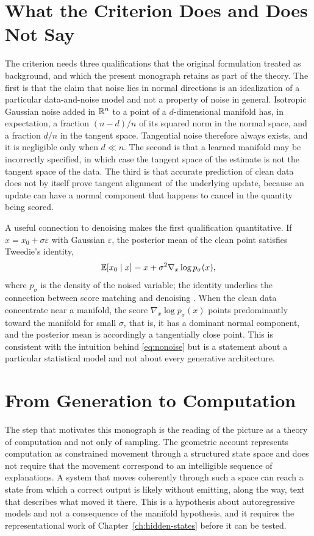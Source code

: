 \section{What the Criterion Does and Does Not Say}

The criterion needs three qualifications that the original formulation treated as background, and which the present monograph retains as part of the theory. The first is that the claim that noise lies in normal directions is an idealization of a particular data-and-noise model and not a property of noise in general. Isotropic Gaussian noise added in $\mathbb{R}^n$ to a point of a $d$-dimensional manifold has, in expectation, a fraction $(n-d)/n$ of its squared norm in the normal space, and a fraction $d/n$ in the tangent space. Tangential noise therefore always exists, and it is negligible only when $d\ll n$. The second is that a learned manifold may be incorrectly specified, in which case the tangent space of the estimate is not the tangent space of the data. The third is that accurate prediction of clean data does not by itself prove tangent alignment of the underlying update, because an update can have a normal component that happens to cancel in the quantity being scored.

A useful connection to denoising makes the first qualification quantitative. If $x=x_0+\sigma\varepsilon$ with Gaussian $\varepsilon$, the posterior mean of the clean point satisfies Tweedie's identity,
\[
\mathbb{E}[x_0\mid x]=x+\sigma^2\nabla_x\log p_\sigma(x),
\]
where $p_\sigma$ is the density of the noised variable; the identity underlies the connection between score matching and denoising \cite{vincent2011}. When the clean data concentrate near a manifold, the score $\nabla_x\log p_\sigma(x)$ points predominantly toward the manifold for small $\sigma$, that is, it has a dominant normal component, and the posterior mean is accordingly a tangentially close point. This is consistent with the intuition behind \eqref{eq:nonoise} but is a statement about a particular statistical model and not about every generative architecture.

\section{From Generation to Computation}

The step that motivates this monograph is the reading of the picture as a theory of computation and not only of sampling. The geometric account represents computation as constrained movement through a structured state space and does not require that the movement correspond to an intelligible sequence of explanations. A system that moves coherently through such a space can reach a state from which a correct output is likely without emitting, along the way, text that describes what moved it there. This is a hypothesis about autoregressive models and not a consequence of the manifold hypothesis, and it requires the representational work of Chapter~\ref{ch:hidden-states} before it can be tested.

